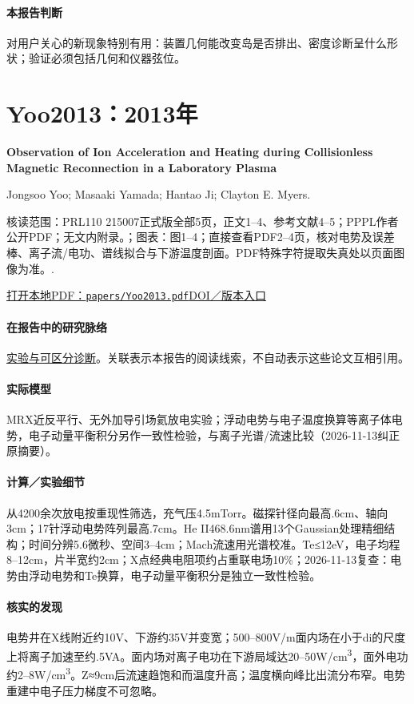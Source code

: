 \paragraph{本报告判断}对用户关心的新现象特别有用：装置几何能改变岛是否排出、密度诊断呈什么形状；验证必须包括几何和仪器弦位。

\section{Yoo2013：2013年}\label{paper:Yoo2013}

\textbf{Observation of Ion Acceleration and Heating during Collisionless Magnetic Reconnection in a Laboratory Plasma}\citep{Yoo2013}\

Jongsoo Yoo;  Masaaki Yamada;  Hantao Ji;  Clayton E. Myers.

\textsf{核读范围：}PRL110 215007正式版全部5页，正文1–4、参考文献4–5；PPPL作者公开PDF；无文内附录。；\textsf{图表：}图1–4；直接查看PDF2–4页，核对电势及误差棒、离子流/电功、谱线拟合与下游温度剖面。PDF特殊字符提取失真处以页面图像为准。.

\href{run:papers/Yoo2013.pdf}{打开本地PDF：\texttt{papers/Yoo2013.pdf}}\quad\href{https://doi.org/10.1103/PhysRevLett.110.215007}{DOI／版本入口}

\paragraph{在报告中的研究脉络}\hyperref[story:diagnostic]{实验与可区分诊断}。关联表示本报告的阅读线索，不自动表示这些论文互相引用。

\paragraph{实际模型}MRX近反平行、无外加导引场氦放电实验；浮动电势与电子温度换算等离子体电势，电子动量平衡积分另作一致性检验，与离子光谱/流速比较（2026-11-13纠正原摘要）。

\paragraph{计算／实验细节}从4200余次放电按重现性筛选，充气压4.5mTorr。磁探针径向最高.6cm、轴向3cm；17针浮动电势阵列最高.7cm。He II468.6nm谱用13个Gaussian处理精细结构；时间分辨5.6微秒、空间3–4cm；Mach流速用光谱校准。Te≤12eV，电子均程8–12cm，片半宽约2cm；X点经典电阻项约占重联电场10\%；2026-11-13复查：电势由浮动电势和Te换算，电子动量平衡积分是独立一致性检验。

\paragraph{核实的发现}电势井在X线附近约10V、下游约35V并变宽；500–800V/m面内场在小于di的尺度上将离子加速至约.5VA。面内场对离子电功在下游局域达20–50W/cm\textsuperscript{3}，面外电功约2–8W/cm\textsuperscript{3}。Z≈9cm后流速趋饱和而温度升高；温度横向峰比出流分布窄。电势重建中电子压力梯度不可忽略。

